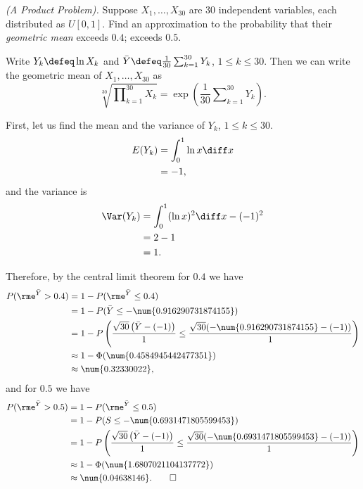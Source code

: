 \begin{problem}[Handout 14, \# 8]
  \emph{(A Product Problem).} Suppose \(X_1,\dotsc,X_{30}\) are \(30\)
  independent variables, each distributed as \(U[0,1]\). Find an
  approximation to the probability that their \emph{geometric mean} exceeds
  \(0.4\); exceeds \(0.5\).
\end{problem}
\begin{solution}
  Write \(Y_k\defeq \ln X_k\) and
  \(\bar Y\defeq\frac{1}{30}\sum_{k=1}^{30}Y_k\), \(1\leq k\leq 30\). Then we
  can write the geometric mean of \(X_1,\dotsc,X_{30}\) as
  \[
    \sqrt[30]{\prod\nolimits_{k=1}^{30} X_k}
    =\exp\left(\frac{1}{30}\sum\nolimits_{k=1}^{30} Y_k\right).
  \]

  First, let us find the mean and the variance of \(Y_k\), \(1\leq k\leq
  30\).
  \begin{align*}
    E(Y_k)
    &=\int_0^1 \ln x\diff x\\
    &=-1,
  \end{align*}
  and the variance is
  \begin{align*}
    \Var(Y_k)
    &=\int_0^1 (\ln x)^2\diff x-(-1)^2\\
    &=2-1\\
    &=1.
  \end{align*}

  Therefore, by the central limit theorem for \(0.4\) we have
  \begin{align*}
    P(\rme^{\bar Y}>0.4)
    &=1-P(\rme^{\bar Y}\leq 0.4)\\
    &=1-P(\bar Y\leq-\num{0.916290731874155})\\
    &=1-P\left(\frac{\sqrt{30}\left(\bar Y-(-1)\right)}{1}
      \leq\frac{\sqrt{30}(-\num{0.916290731874155}-(-1))}{1}\right)\\
    &\approx 1-\Phi(\num{0.4584945442477351})\\
    &\approx\num{0.32330022},
  \end{align*}
  and for \(0.5\) we have
  \begin{align*}
    P(\rme^{\bar Y}>0.5)
    &=1-P(\rme^{\bar Y}\leq 0.5)\\
    &=1-P(S\leq-\num{0.6931471805599453})\\
    &=1-P\left(\frac{\sqrt{30}\left(\bar Y-(-1)\right)}{1}
      \leq\frac{\sqrt{30}(-\num{0.6931471805599453}-(-1))}{1}\right)\\
    &\approx 1-\Phi(\num{1.6807021104137772})\\
    &\approx\num{0.04638146}.\qedhere
  \end{align*}
\end{solution}
\newpage


